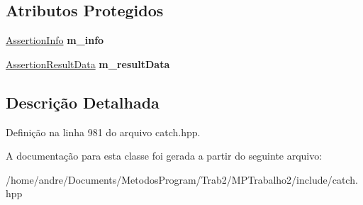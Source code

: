 \subsection*{Atributos Protegidos}
\begin{DoxyCompactItemize}
\item 
\hyperlink{structCatch_1_1AssertionInfo}{Assertion\+Info} {\bfseries m\+\_\+info}\hypertarget{classCatch_1_1AssertionResult_a3e7236f73a51d6fc8bb9dfdefcee7772}{}\label{classCatch_1_1AssertionResult_a3e7236f73a51d6fc8bb9dfdefcee7772}

\item 
\hyperlink{structCatch_1_1AssertionResultData}{Assertion\+Result\+Data} {\bfseries m\+\_\+result\+Data}\hypertarget{classCatch_1_1AssertionResult_add3455b8bbedb0d643e18da67c66b4f7}{}\label{classCatch_1_1AssertionResult_add3455b8bbedb0d643e18da67c66b4f7}

\end{DoxyCompactItemize}


\subsection{Descrição Detalhada}


Definição na linha 981 do arquivo catch.\+hpp.



A documentação para esta classe foi gerada a partir do seguinte arquivo\+:\begin{DoxyCompactItemize}
\item 
/home/andre/\+Documents/\+Metodos\+Program/\+Trab2/\+M\+P\+Trabalho2/include/catch.\+hpp\end{DoxyCompactItemize}

